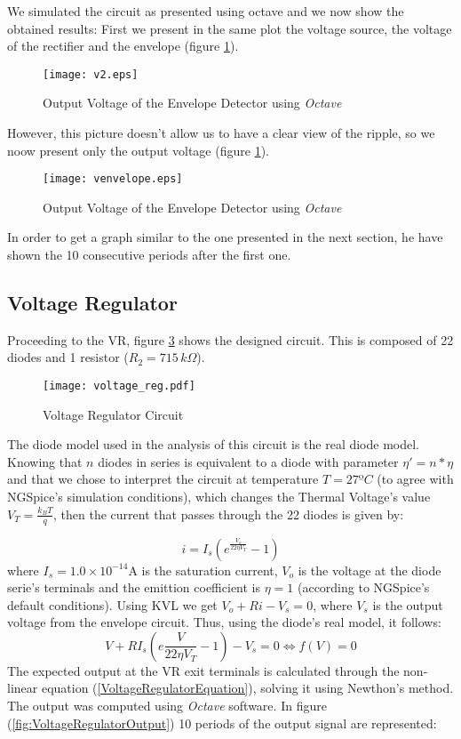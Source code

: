 We simulated the circuit as presented using octave and we now show the obtained results:
First we present in the same plot the voltage source, the voltage of the rectifier and the envelope (figure \ref{fig:venvelope1}).
\begin{figure}[h!]
  \centering
  \texttt{[image: v2.eps]}
  \caption{Output Voltage of the Envelope Detector using \emph{Octave}}
  \label{fig:venvelope1}
\end{figure}
However, this picture doesn't allow us to have a clear view of the ripple, so we noow present only the output voltage (figure \ref{fig:venvelope1}).
\begin{figure}[H]
  \centering
  \texttt{[image: venvelope.eps]}
  \caption{Output Voltage of the Envelope Detector using \emph{Octave}}
  \label{fig:venvelope2}
\end{figure}
In order to get a graph similar to the one presented in the next section, he have shown the 10 consecutive periods after the first one.







\subsection{Voltage Regulator}

Proceeding to the VR, figure \ref{fig:voltage regulator} shows the designed circuit. This is composed of 22 diodes and 1 resistor ($R_2=715 \, k\Omega$).
\begin{figure}[h!]
  \centering
  \texttt{[image: voltage\_reg.pdf]}
  \caption{Voltage Regulator Circuit}
  \label{fig:voltage regulator}
\end{figure}

The diode model used in the analysis of this circuit is the real diode model. Knowing that $n$ diodes in series is equivalent to a diode with parameter $\eta'=n*\eta$ and that we chose to
interpret the circuit at temperature $T=27ºC$ (to agree with NGSpice's simulation conditions), which changes the Thermal Voltage's value $V_T=\frac{k_BT}{q}$, then the current that passes through the 22 diodes is given by:

\begin{equation}
i=I_s(e^{\frac{V_o}{22 \eta V_T}}-1)
\end{equation}
where $I_s=1.0\times 10^{-14}$A is the saturation current, $V_o$ is the voltage at the diode serie's terminals and the emittion coefficient is $\eta=1$ (according to NGSpice's default conditions).
Using KVL we get $V_o+Ri-V_s=0$, where $V_s$ is the output voltage from the envelope circuit. Thus, using the diode's real model, it follows:
\begin{equation}
  V+RI_s(e{\frac{V}{22 \eta V_T}}-1)-V_s=0 \Leftrightarrow f(V)=0
  \label{VoltageRegulatorEquation}
\end{equation}
The expected output at the VR exit terminals is calculated through the non-linear equation (\ref{VoltageRegulatorEquation}), solving it using Newthon's method.
The output was computed using \textit{Octave} software. In figure (\ref{fig:VoltageRegulatorOutput}) 10 periods of the output signal are represented:

